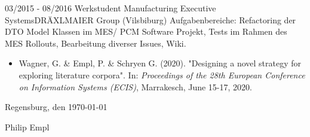 \cvevent
{03/2015 - 08/2016}
{Werkstudent}
{Manufacturing Executive Systems\newline DRÄXLMAIER Group (Vilsbiburg)}
{Aufgabenbereiche: Refactoring der DTO Model Klassen im MES/ PCM Software Projekt, Tests im Rahmen des MES Rollouts, Bearbeitung diverser Issues, Wiki.}
\vfill\null



\begin{itemize}[leftmargin=*]
	\item Wagner, G. \& Empl, P. \&  Schryen G. (2020). "Designing a novel strategy for exploring literature corpora". In: \textit{Proceedings of the 28th European Conference on Information Systems (ECIS)}, Marrakesch, June 15-17, 2020.
\end{itemize}
\mbox{}
\vfill
\mbox{}
\vfill
\mbox{}
\vfill
\mbox{}
\vfill
\mbox{}
\vfill
\mbox{}
\vfill
\mbox{}


Regensburg, den \today     \hspace{1cm}   \hrulefill

\hspace*{30mm}\phantom{Regensburg, den \today }Philip Empl
